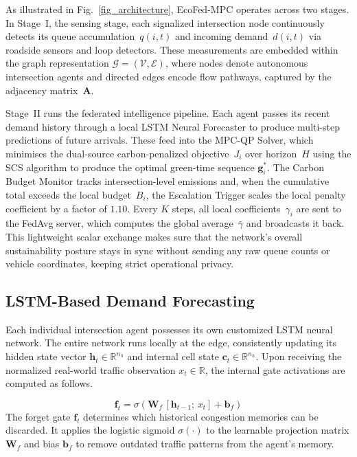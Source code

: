 \documentclass[journal]{IEEEtran}
\begin{document}
As illustrated in Fig.~\ref{fig_architecture}, EcoFed-MPC operates across two stages. In Stage~I, the sensing stage, each signalized intersection node continuously detects its queue accumulation~$q(i,t)$ and incoming demand~$d(i,t)$ via roadside sensors and loop detectors. These measurements are embedded within the graph representation $\mathcal{G}=(\mathcal{V},\mathcal{E})$, where nodes denote autonomous intersection agents and directed edges encode flow pathways, captured by the adjacency matrix~$\mathbf{A}$.

Stage~II runs the federated intelligence pipeline. Each agent passes its recent demand history through a local LSTM Neural Forecaster to produce multi-step predictions of future arrivals. These feed into the MPC-QP Solver, which minimises the dual-source carbon-penalized objective~$J_i$ over horizon~$H$ using the SCS algorithm to produce the optimal green-time sequence $\mathbf{g}_i^*$. The Carbon Budget Monitor tracks intersection-level emissions and, when the cumulative total exceeds the local budget~$B_i$, the Escalation Trigger scales the local penalty coefficient by a factor of $1.10$. Every $K$ steps, all local coefficients~$\gamma_i$ are sent to the FedAvg server, which computes the global average~$\bar{\gamma}$ and broadcasts it back. This lightweight scalar exchange makes sure that the network's overall sustainability posture stays in sync without sending any raw queue counts or vehicle coordinates, keeping strict operational privacy.

\subsection{LSTM-Based Demand Forecasting}
Each individual intersection agent possesses its own customized LSTM neural network. The entire network runs locally at the edge, consistently updating its hidden state vector $\mathbf{h}_t \in \mathbb{R}^{n_h}$ and internal cell state $\mathbf{c}_t \in \mathbb{R}^{n_h}$. Upon receiving the normalized real-world traffic observation $x_t \in \mathbb{R}$, the internal gate activations are computed as follows.

\begin{equation}
    \mathbf{f}_t = \sigma\!\left(\mathbf{W}_f\,[{\mathbf{h}_{t-1};\,x_t}]
                  + \mathbf{b}_f\right)
    \label{eq:lstm_f}
\end{equation}
The forget gate $\mathbf{f}_t$ determines which historical congestion memories can be discarded. It applies the logistic sigmoid $\sigma(\cdot)$ to the learnable projection matrix $\mathbf{W}_f$ and bias $\mathbf{b}_f$ to remove outdated traffic patterns from the agent's memory.
\end{document}
